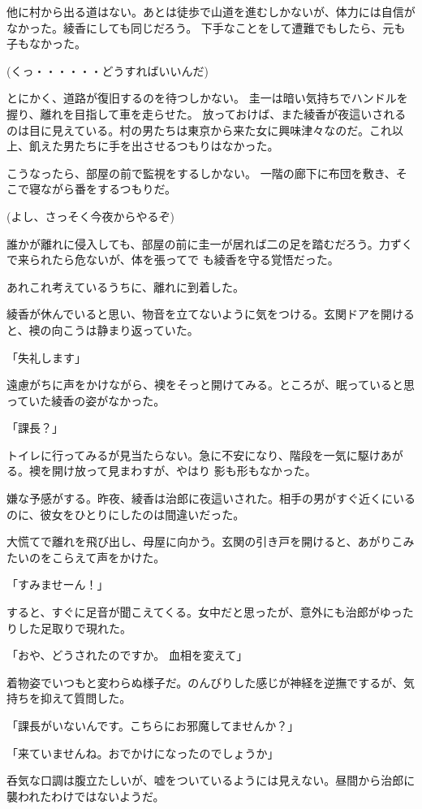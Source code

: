 ﻿\documentclass[book,tate]{jlreq}
\begin{document}
他に村から出る道はない。あとは徒歩で山道を進むしかないが、体力には自信がなかった。綾香にしても同じだろう。 下手なことをして遭難でもしたら、元も子もなかった。

(くっ・・・・・・どうすればいいんだ)

とにかく、道路が復旧するのを待つしかない。 圭一は暗い気持ちでハンドルを握り、離れを目指して車を走らせた。 放っておけば、また綾香が夜這いされるのは目に見えている。村の男たちは東京から来た女に興味津々なのだ。これ以 上、飢えた男たちに手を出させるつもりはなかった。

こうなったら、部屋の前で監視をするしかない。 一階の廊下に布団を敷き、そこで寝ながら番をするつもりだ。

(よし、さっそく今夜からやるぞ)

誰かが離れに侵入しても、部屋の前に圭一が居れば二の足を踏むだろう。力ずくで来られたら危ないが、体を張ってで も綾香を守る覚悟だった。

あれこれ考えているうちに、離れに到着した。

綾香が休んでいると思い、物音を立てないように気をつける。玄関ドアを開けると、襖の向こうは静まり返っていた。

「失礼します」

遠慮がちに声をかけながら、襖をそっと開けてみる。ところが、眠っていると思っていた綾香の姿がなかった。

「課長？」

トイレに行ってみるが見当たらない。急に不安になり、階段を一気に駆けあがる。襖を開け放って見まわすが、やはり 影も形もなかった。

嫌な予感がする。昨夜、綾香は治郎に夜這いされた。相手の男がすぐ近くにいるのに、彼女をひとりにしたのは間違いだった。

大慌てで離れを飛び出し、母屋に向かう。玄関の引き戸を開けると、あがりこみたいのをこらえて声をかけた。

「すみませーん！」

すると、すぐに足音が聞こえてくる。女中だと思ったが、意外にも治郎がゆったりした足取りで現れた。

「おや、どうされたのですか。 血相を変えて」

着物姿でいつもと変わらぬ様子だ。のんびりした感じが神経を逆撫でするが、気持ちを抑えて質問した。

「課長がいないんです。こちらにお邪魔してませんか？」

「来ていませんね。おでかけになったのでしょうか」

呑気な口調は腹立たしいが、嘘をついているようには見えない。昼間から治郎に襲われたわけではないようだ。
\end{document}
